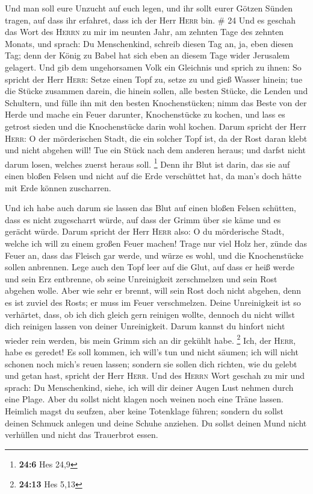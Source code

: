  Und man soll eure Unzucht auf euch legen, und ihr sollt
eurer Götzen Sünden tragen, auf dass ihr erfahret, dass ich der Herr
\textsc{Herr} bin. \# 24  Und es geschah das Wort des
\textsc{Herrn} zu mir im neunten Jahr, am zehnten Tage des zehnten
Monats, und sprach:  Du Menschenkind, schreib diesen Tag
an, ja, eben diesen Tag; denn der König zu Babel hat sich eben an diesem
Tage wider Jerusalem gelagert.  Und gib dem ungehorsamen
Volk ein Gleichnis und sprich zu ihnen: So spricht der Herr
\textsc{Herr}: Setze einen Topf zu, setze zu und gieß Wasser hinein;
 tue die Stücke zusammen darein, die hinein sollen, alle
besten Stücke, die Lenden und Schultern, und fülle ihn mit den besten
Knochenstücken;  nimm das Beste von der Herde und mache
ein Feuer darunter, Knochenstücke zu kochen, und lass es getrost sieden
und die Knochenstücke darin wohl kochen.  Darum spricht
der Herr \textsc{Herr}: O der mörderischen Stadt, die ein solcher Topf
ist, da der Rost daran klebt und nicht abgehen will! Tue ein Stück nach
dem anderen heraus; und darfst nicht darum losen, welches zuerst heraus
soll. \footnote{\textbf{24:6} Hes 24,9}  Denn ihr Blut ist
darin, das sie auf einen bloßen Felsen und nicht auf die Erde
verschüttet hat, da man's doch hätte mit Erde können zuscharren.

 Und ich habe auch darum sie lassen das Blut auf einen
bloßen Felsen schütten, dass es nicht zugescharrt würde, auf dass der
Grimm über sie käme und es gerächt würde.  Darum spricht
der Herr \textsc{Herr} also: O du mörderische Stadt, welche ich will zu
einem großen Feuer machen!  Trage nur viel Holz her,
zünde das Feuer an, dass das Fleisch gar werde, und würze es wohl, und
die Knochenstücke sollen anbrennen.  Lege auch den Topf
leer auf die Glut, auf dass er heiß werde und sein Erz entbrenne, ob
seine Unreinigkeit zerschmelzen und sein Rost abgehen wolle.
 Aber wie sehr er brennt, will sein Rost doch nicht
abgehen, denn es ist zuviel des Rosts; er muss im Feuer verschmelzen.
 Deine Unreinigkeit ist so verhärtet, dass, ob ich dich
gleich gern reinigen wollte, dennoch du nicht willst dich reinigen
lassen von deiner Unreinigkeit. Darum kannst du hinfort nicht wieder
rein werden, bis mein Grimm sich an dir gekühlt habe. \footnote{\textbf{24:13}
  Hes 5,13}  Ich, der \textsc{Herr}, habe es geredet! Es
soll kommen, ich will's tun und nicht säumen; ich will nicht schonen
noch mich's reuen lassen; sondern sie sollen dich richten, wie du gelebt
und getan hast, spricht der Herr \textsc{Herr}.  Und des
\textsc{Herrn} Wort geschah zu mir und sprach:  Du
Menschenkind, siehe, ich will dir deiner Augen Lust nehmen durch eine
Plage. Aber du sollst nicht klagen noch weinen noch eine Träne lassen.
 Heimlich magst du seufzen, aber keine Totenklage führen;
sondern du sollst deinen Schmuck anlegen und deine Schuhe anziehen. Du
sollst deinen Mund nicht verhüllen und nicht das Trauerbrot essen.

